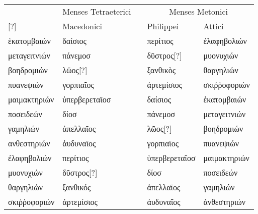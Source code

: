\begin{tabular}{@{}l l c ll@{}}
\toprule
 &
 \multicolumn{1}{c}{Menses Tetraeterici} & &
 \multicolumn{2}{c}{Menses Metonici} \\
\cmidrule{2-2}\cmidrule{4-5}
 [?] & Macedonici & & Philippei & Attici \\
\midrule[\heavyrulewidth]
 \textgreek{ἑκατομβαιών} &
 \textgreek{δαίσιος} & &
 \textgreek{περίτιος} &
 \textgreek{ἐλαφηβολιών}
\\
 \textgreek{μεταγειτνιών} &
 \textgreek{πάνεμοσ} & &
 \textgreek{δῦστρος[?]} &
 \textgreek{μυονυχιών}
\\
 \textgreek{βοηδρομιών} &
 \textgreek{λῶος[?]} & & %
 \textgreek{ξανθικὸς} &
 \textgreek{θαργηλιών}
\\
\midrule
 \textgreek{πυανεψιών} &
 \textgreek{γορπιαῖος} & &
 \textgreek{ἀρτεμίσιος} &
 \textgreek{σκιῤῥοφοριών}
\\
 \textgreek{μαιμακτηριών} &
 \textgreek{ὑπερβερεταῖοσ} & &
 \textgreek{δαίσιος} &
 \textgreek{ἑκατομβαιών}
\\
 \textgreek{ποσειδεών} &
 \textgreek{δίοσ} & &
 \textgreek{πάνεμοσ} &
 \textgreek{μεταγειτνιών}
\\
\midrule
 \textgreek{γαμηλιών} &
 \textgreek{ἀπελλαῖος} & &
 \textgreek{λῶος[?]} &
 \textgreek{βοηδρομιών}
\\
 \textgreek{ανθεστηριών} &
 \textgreek{ἀυδυναῖος} & &
 \textgreek{γορπιαῖος} &
 \textgreek{πυανεψιών}
\\
 \textgreek{ἐλαφηβολιών} &
 \textgreek{περίτιος} & &
 \textgreek{ὑπερβερεταῖοσ} &
 \textgreek{μαιμακτηριών}
\\
\midrule
 \textgreek{μυονυχιών} &
 \textgreek{δῦστρος[?]} & & %
 \textgreek{δίοσ} &
 \textgreek{ποσειδεών}
\\
 \textgreek{θαργηλιών} &
 \textgreek{ξανθικός} & &
 \textgreek{ἀπελλαῖος} &
 \textgreek{γαμηλιών}
\\
 \textgreek{σκιῤῥοφοριών} &
 \textgreek{ἀρτεμίσιος} & &
 \textgreek{ἀυδυναῖος} &
 \textgreek{ἀνθεστηριών}
\\
\bottomrule
\end{tabular}
%
